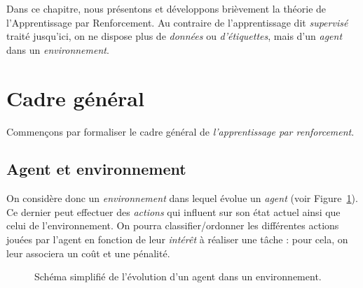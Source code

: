 
\minitoc

Dans ce chapitre, nous présentons et développons brièvement la théorie de l'Apprentissage par Renforcement. Au contraire de l'apprentissage dit \emph{supervisé} traité jusqu'ici, on ne dispose plus de \emph{données} ou \emph{d'étiquettes}, mais d'un \emph{agent} dans un \emph{environnement}. 


\section{Cadre général}

Commençons par formaliser le cadre général de \emph{l'apprentissage par renforcement}. 

\subsection{Agent et environnement}

On considère donc un \emph{environnement} dans lequel évolue un \emph{agent} (voir Figure~\ref{fig:reinforcement-basic-schema}). Ce dernier peut effectuer des \emph{actions} qui influent sur son état actuel ainsi que celui de l'environnement. On pourra classifier/ordonner les différentes actions jouées par l'agent en fonction de leur \emph{intérêt} à réaliser une tâche : pour cela, on leur associera un coût et une pénalité. 

\begin{figure}[thbp]
    \centering
    \caption{Schéma simplifié de l'évolution d'un agent dans un environnement.}
    \label{fig:reinforcement-basic-schema}
\end{figure}

